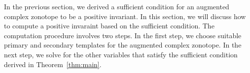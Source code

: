 In the previous section, we derived a sufficient condition for an
augmented complex zonotope to be a positive invariant.  In this
section, we will discuss how to compute a positive invaraint based on
the sufficient condition.  The computation procedure involves two
steps.  In the first step, we choose suitable primary and secondary
templates for the augmented complex zonotope.  In the next step, we
solve for the other variables that satisfy the sufficient condition
derived in Theorem~\ref{thm:main}.


